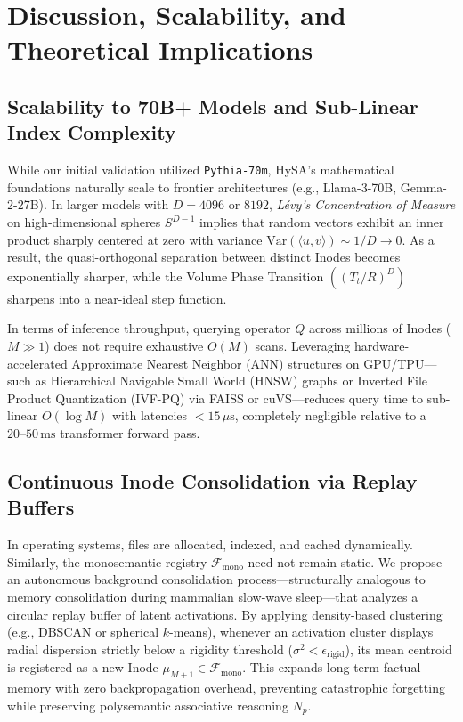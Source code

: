 \documentclass[10pt,twocolumn]{article}
\theoremstyle{definition}
\begin{document}
\section{Discussion, Scalability, and Theoretical Implications}

\subsection{Scalability to 70B+ Models and Sub-Linear Index Complexity}
While our initial validation utilized \texttt{Pythia-70m}, HySA's mathematical foundations naturally scale to frontier architectures (e.g., Llama-3-70B, Gemma-2-27B). In larger models with $D=4096$ or $8192$, \textit{Lévy's Concentration of Measure} on high-dimensional spheres $S^{D-1}$ implies that random vectors exhibit an inner product sharply centered at zero with variance $\mathrm{Var}(\langle u, v \rangle) \sim 1/D \to 0$. As a result, the quasi-orthogonal separation between distinct Inodes becomes exponentially sharper, while the Volume Phase Transition $((T_t/R)^D)$ sharpens into a near-ideal step function.

In terms of inference throughput, querying operator $Q$ across millions of Inodes ($M \gg 1$) does not require exhaustive $O(M)$ scans. Leveraging hardware-accelerated Approximate Nearest Neighbor (ANN) structures on GPU/TPU---such as Hierarchical Navigable Small World (HNSW) graphs or Inverted File Product Quantization (IVF-PQ) via FAISS or cuVS---reduces query time to sub-linear $O(\log M)$ with latencies $<15\,\mu\text{s}$, completely negligible relative to a $20\text{--}50\,\text{ms}$ transformer forward pass.

\subsection{Continuous Inode Consolidation via Replay Buffers}
In operating systems, files are allocated, indexed, and cached dynamically. Similarly, the monosemantic registry $\mathcal{F}_{\mathrm{mono}}$ need not remain static. We propose an autonomous background consolidation process---structurally analogous to memory consolidation during mammalian slow-wave sleep---that analyzes a circular replay buffer of latent activations. By applying density-based clustering (e.g., DBSCAN or spherical $k$-means), whenever an activation cluster displays radial dispersion strictly below a rigidity threshold ($\sigma^2 < \epsilon_{\mathrm{rigid}}$), its mean centroid is registered as a new Inode $\mu_{M+1} \in \mathcal{F}_{\mathrm{mono}}$. This expands long-term factual memory with zero backpropagation overhead, preventing catastrophic forgetting while preserving polysemantic associative reasoning $N_p$.
\end{document}
